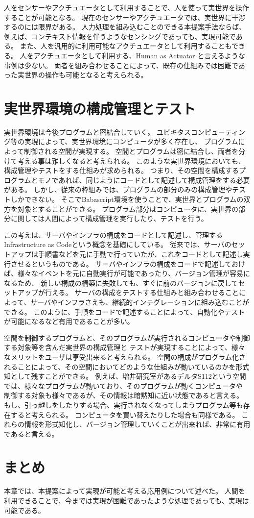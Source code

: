 人をセンサーやアクチュエータとして利用することで、人を使って実世界を操作することが可能となる。
現在のセンサーやアクチュエータでは、実世界に干渉するのには限界がある。
人力処理を組み込むことのできる本提案手法ならば、例えば、コンテキスト情報を伴うようなセンシングであっても、実現可能である。
また、人を汎用的に利用可能なアクチュエータとして利用することもできる。
人をアクチュエータとして利用する、Human as Actuator
と言えるような事例は少ない。
両者を組み合わせることによって、既存の仕組みでは困難であった実世界の操作も可能となると考えられる。

\section{実世界環境の構成管理とテスト}\label{ux5b9fux4e16ux754cux74b0ux5883ux306eux69cbux6210ux7ba1ux7406ux3068ux30c6ux30b9ux30c8}

実世界環境は今後プログラムと密結合していく。
ユビキタスコンピューティング等の実現によって、実世界環境にコンピュータが多く存在し、
プログラムによって制御される空間が実現する。
空間とプログラムは密に結合し、両者を分けて考える事は難しくなると考えられる。
このような実世界環境においても、構成管理やテストをする仕組みが求められる。
つまり、その空間を構成するプログラムとモノであれば、同じようにコードとして記述して構成管理をする必要がある。
しかし、従来の枠組みでは、プログラムの部分のみの構成管理やテストしかできない。
そこでBabascript環境を使うことで、実世界とプログラムの双方を対象とすることができる。
プログラム部分はコンピュータに、実世界の部分に関しては人間によって構成管理を実行したり、テストを行う。

この考えは、サーバやインフラの構成をコードとして記述し、管理するInfrastructure
as Codeという概念を基礎にしている。
従来では、サーバのセットアップは手順書などを元に手動で行っていたが、これをコードとして記述し実行させるというものである。
サーバやインフラの構成をコードで記述しておけば、様々なイベントを元に自動実行が可能であったり、バージョン管理が容易になるため、
新しい構成の構築に失敗しても、すぐに前のバージョンに戻してセットアップが行える。
サーバの構成をテストする仕組みと組み合わせることによって、サーバやインフラさえも、継続的インテグレーションに組み込むことができる。
このように、手順をコードで記述することによって、自動化やテストが可能になるなど有用であることが多い。

空間を制御するプログラムと、そのプログラムが実行されるコンピュータや制御する対象等を含んだ実世界の構成管理と
テストが実現することによって、様々なメリットをユーザは享受出来ると考えられる。
空間の構成がプログラム化されることによって、その空間においてどのような仕組みが動いているのかを形式知として残すことができる。
例えば、増井研究室があるデルタS112という空間では、様々なプログラムが動いており、そのプログラムが動くコンピュータや
制御する対象も様々であるが、その情報は暗黙知に近い状態であると言える。
もし、引っ越しをしたりする場合、実行されなくなってしまうプログラム等も存在すると考えられる。
コンピュータを買い替えたりした場合も同様である。
これらの情報を形式知化し、バージョン管理していくことが出来れば、非常に有用であると言える。

\section{まとめ}\label{ux307eux3068ux3081}

本章では、本提案によって実現が可能と考える応用例について述べた。
人間を利用できることで、今までは実現が困難であったような処理であっても、実現は可能である。
